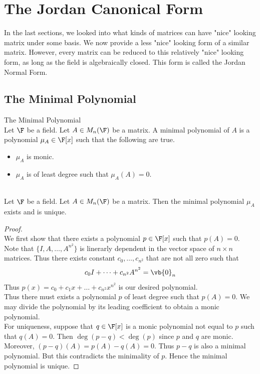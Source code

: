 \documentclass[a4paper]{article}
\begin{document}
\pagebreak
\section{The Jordan Canonical Form}
In the last sections, we looked into what kinds of matrices can have "nice" looking matrix under some basis. We now provide a less "nice" looking form of a similar matrix. However, every matrix can be reduced to this relatively "nice" looking form, as long as the field is algebraically closed. This form is called the Jordan Normal Form. 

\subsection{The Minimal Polynomial}
\begin{defn}{The Minimal Polynomial}{}\\
Let $\F$ be a field. Let $A\in M_n(\F)$ be a matrix. A minimal polynomial of $A$ is a polynomial $\mu_A\in\F[x]$ such that the following are true. 
\begin{itemize}
\item $\mu_A$ is monic. 
\item $\mu_A$ is of least degree such that $\mu_A(A)=0$. 
\end{itemize}
\end{defn}

\begin{prp}{}{}\\
Let $\F$ be a field. Let $A\in M_n(\F)$ be a matrix. Then the minimal polynomial $\mu_A$ exists and is unique. 
\begin{proof}\\
We first show that there exists a polynomial $p\in\F[x]$ such that $p(A)=0$. Note that $\{I,A,\dots,A^{n^2}\}$ is linerarly dependent in the vector space of $n\times n$ matrices. Thus there exists constant $c_0,\dots,c_{n^2}$ that are not all zero such that $$c_0I+\dots+c_{n^2}A^{n^2}=\vb{0}_n$$ Thus $p(x)=c_0+c_1x+\dots+c_{n^2}x^{n^2}$ is our desired polynomial. \\

Thus there must exists a polynomial $p$ of least degree such that $p(A)=0$. We may divide the polynomial by its leading coefficient to obtain a monic polynomial. \\

For uniqueness, suppose that $q\in\F[x]$ is a monic polynomial not equal to $p$ such that $q(A)=0$. Then $\deg(p-q)<\deg(p)$ since $p$ and $q$ are monic. Moreover, $(p-q)(A)=p(A)-q(A)=0$. Thus $p-q$ is also a minimal polynomial. But this contradicts the minimality of $p$. Hence the minimal polynomial is unique. 
\end{proof}
\end{prp}
\end{document}
